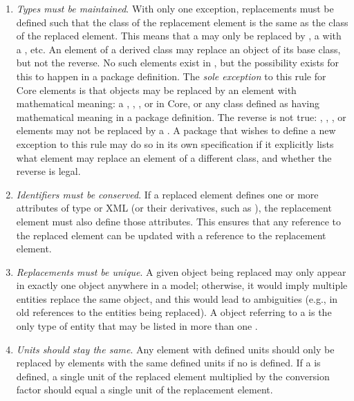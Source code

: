 \begin{enumerate}

\item \emph{Types must be maintained}.  With only one exception,
  replacements must be defined such that the class of the replacement
  element is the same as the class of the replaced element.  This means
  that a \Species may only be replaced by \Species, a \Reaction with a
  \Reaction, etc.  An element of a derived class may replace an object
  of its base class, but not the reverse.  No such elements exist in
  \sbmlthreecore, but the possibility exists for this to happen in a
  package definition.  The \emph{sole exception} to this rule for Core
  elements is that \Parameter objects may be replaced by an element with
  mathematical meaning: a \Compartment, \Reaction, \Species, or
  \SpeciesReference in Core, or any class defined as having mathematical
  meaning in a package definition.  The reverse is not true:
  \Compartment, \Reaction, \Species, or \SpeciesReference elements may
  not be replaced by a \Parameter.  A package that wishes to define a
  new exception to this rule may do so in its own specification if it
  explicitly lists what element may replace an element of a different
  class, and whether the reverse is legal.

\item \emph{Identifiers must be conserved}.  If a replaced element
  defines one or more attributes of type  or XML 
  (or their derivatives, such as ), the replacement
  element must also define those attributes.  This ensures that any
  reference to the replaced element can be updated with a reference to
  the replacement element.

\item \emph{Replacements must be unique}.  A given object
  being replaced may only appear in exactly one \ReplacedElement object
  anywhere in a model; otherwise, it would imply multiple entities
  replace the same object, and this would lead to ambiguities (e.g., in
  old references to the entities being replaced).  A \ReplacedElement
  object referring to a \Deletion is the only type of entity
  that may be listed in more than one \ListOfReplacedElements.

\item \emph{Units should stay the same}.  Any element with defined units
  should only be replaced by elements with the same defined units if no
   is defined.  If a  is
  defined, a single unit of the replaced element multiplied by the
  conversion factor should equal a single unit of the replacement
  element.
  

\end{enumerate}
